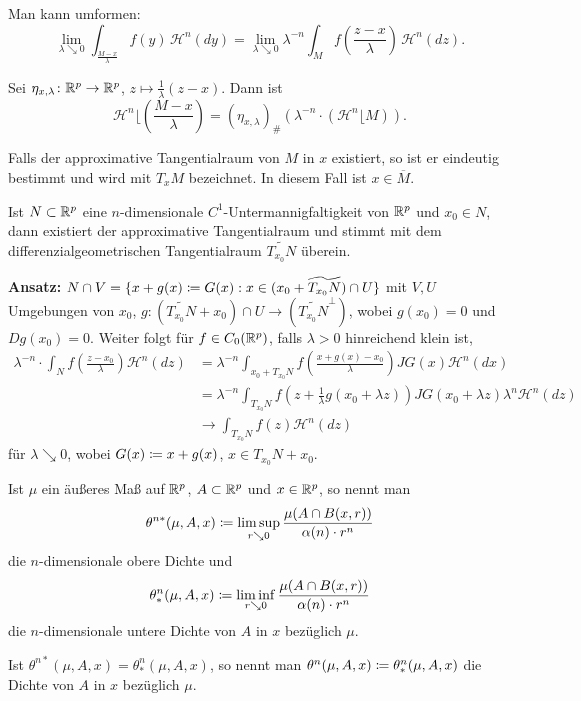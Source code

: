 \documentclass[a4paper,twoside,DIV15,BCOR12mm]{scrbook}
\newcommand{\HM}{\mathscr H}
\newcommand{\downto}{\mathrel\searrow}
\newcommand{\MR}{\lfloor}
\begin{document}
\begin{bemerkungen}
\item Man kann umformen:
\[
\lim_{\lambda \downto0} \int_{\frac{M-x}\lambda} f(y)\, \HM^n(dy) =  \lim_{\lambda\downto0} \lambda^{-n}\int_M f(\frac{z-x}\lambda)\,\HM^n(dz).
\]
\item Sei $\eta_{x,\lambda}\colon\mathbb{R}^p\to\mathbb{R}^p$, $z\mapsto \frac 1\lambda(z-x)$. Dann ist \[
\HM^n\MR \left( \frac{M-x}{\lambda} \right) = (\eta_{x,\lambda})_\# (\lambda^{-n} \cdot (\HM^n\MR M)).
\]
\item Falls der approximative Tangentialraum von $M$ in $x$ existiert, so ist er eindeutig bestimmt und wird mit $T_xM$ bezeichnet. In diesem Fall ist $x\in\overline M$.
\item Ist $N\subset \mathbb{R}^p$ eine $n$-dimensionale $C^1$-Untermannigfaltigkeit von $\mathbb{R}^p$ und $x_0 \in N$, dann existiert der approximative Tangentialraum und stimmt mit dem differenzialgeometrischen Tangentialraum $\widetilde {T_{x_0}N}$ überein.

\textbf{Ansatz:} $N\cap V = \{x + g(x) \da G(x) : x\in (x_0 + \widetilde{T_{x_0}N}) \cap U\}$ mit $V,U$ Umgebungen von $x_0$, $g:(\widetilde{T_{x_0}N} + x_0) \cap U \to (\widetilde{T_{x_0}N}^\bot)$, wobei $g(x_0)=0$ und \(Dg(x_0)=0\). Weiter folgt für \(f \in C_0(\mathbb{R}^p)\), falls \(\lambda>0\) hinreichend klein ist,
\begin{align*}
\lambda^{-n} \cdot \int_N f(\frac{z-x_0}{\lambda}) \HM^n(dz) &= \lambda^{-n} \int_{x_0+T_{x_0}N} f(\frac{x+g(x)-x_0}\lambda) JG(x) \HM^n(dx) \\
&= \lambda^{-n} \int_{T_{x_0}N} f(z+\frac1\lambda g(x_0+\lambda z)) JG(x_0+\lambda z) \lambda^n \HM^n(dz) \\
&\to \int_{T_{x_0}N} f(z) \HM^n(dz)
\end{align*}
für  $ \lambda \downto 0$, 
wobei \(G(x) \da x+g(x)\), \(x\in T_{x_0}N + x_0\).
\end{bemerkungen}

\begin{definition}
Ist \(\mu\) ein äußeres Maß auf \(\mathbb{R}^p\), \(A \subset \mathbb{R}^p\) und \(x \in \mathbb{R}^p\), so nennt man 
\[
\theta^{n*}(\mu,A,x) \da \limsup_{r\downto0} \frac{\mu(A\cap B(x,r))}{\alpha(n)\cdot r^n}
\]
die \(n\)-dimensionale obere Dichte und
\[
\theta^n_*(\mu,A,x) \da \liminf_{r\downto0} \frac{\mu(A\cap B(x,r))}{\alpha(n)\cdot r^n}
\]
die \(n\)-dimensionale untere Dichte von \(A\) in \(x\) bezüglich \(\mu\).
\par
Ist \(\theta^{n*}(\mu,A,x) = \theta^n_*(\mu,A,x)\), so nennt man \(\theta^n(\mu,A,x) \da \theta^n_*(\mu,A,x)\) die Dichte von \(A\) in \(x\) bezüglich \(\mu\).
\end{definition}
\end{document}
